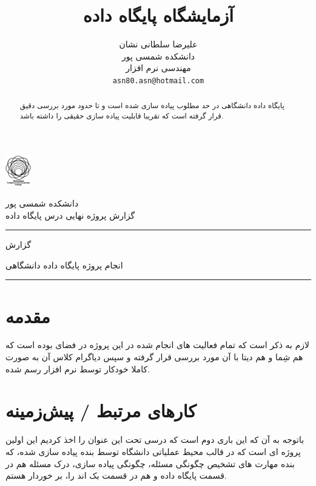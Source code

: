 \documentclass{article}
\title{آزمایشگاه پایگاه داده}
\author{%
  علیرضا سلطانی نشان\\
  دانشکده شمسی پور\\
  مهندسی نرم افزار\\
  \texttt{asn80.asn@hotmail.com}
}
\begin{document}
\maketitle
\tableofcontents

\newpage

\begin{minipage}{0.1\textwidth}%
  \includegraphics[width=1.1cm]{tvu.png}
  \end{minipage}%
  \hfill%
  \begin{minipage}{0.9\textwidth}\raggedleft
  دانشکده شمسی پور\\
  گزارش پروژه نهایی درس پایگاه داده\\
  \end{minipage}

\par\noindent\rule{\textwidth}{3pt}

{\par\centering\large گزارش \par}

{\par\centering\large انجام پروژه پایگاه داده دانشگاهی\par}

\par\noindent\rule{\textwidth}{1pt}


\begin{abstract}
پایگاه داده دانشگاهی در حد مطلوب پیاده سازی شده است و تا حدود مورد بررسی دقیق قرار گرفته است که 
تقریبا قابلیت پیاده سازی حقیقی را داشته باشد.
\end{abstract}

\section{مقدمه}
لازم به ذکر است که تمام فعالیت های انجام شده در این پروژه در فضای
بوده است که هم شِما و هم دیتا با آن مورد بررسی قرار گرفته و سپس دیاگرام کلاس آن
به صورت کاملا خودکار توسط نرم افزار رسم شده.

\section{کار‌های مرتبط / پیش‌زمینه}
باتوجه به آن که این باری دوم است که درسی تحت این عنوان را اخذ کردیم
این اولین پروژه ای است که در قالب محیط عملیاتی دانشگاه 
توسط بنده پیاده سازی شده، که بنده مهارت های تشخیص چگونگی مسئله،
چگونگی پیاده سازی، درک مسئله هم در قسمت پایگاه داده و هم در قسمت بک اند را، بر خوردار هستم.
\end{document}
